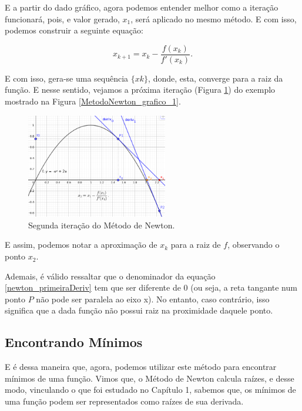 E a partir do dado gráfico, agora podemos entender melhor como a iteração
funcionará, pois, e valor gerado, $x_1$, será aplicado no mesmo método. E com
isso, podemos construir a seguinte equação:

\begin{equation}
    x_{k+1} = x_{k} - \frac {f(x_{k})}{f'(x_{k})}.
    \label{newton_primeiraDeriv}
\end{equation}

E com isso, gera-se uma sequência $\{xk\}$, donde, esta, converge para a raiz
da função. E nesse sentido, vejamos a próxima iteração (Figura
\ref{MetodoNewton_grafico_2}) do exemplo mostrado na Figura
\ref{MetodoNewton_grafico_1}.

\begin{figure}[ht]
    \includegraphics[width=0.55\textwidth]
      {src/MetodoNewton_grafico_2.png}
    \centering
    \caption{
      \centering
      Segunda iteração do Método de Newton.
    }
    \label{MetodoNewton_grafico_2}
\end{figure}

E assim, podemos notar a aproximação de $x_k$ para a raiz de $f$, observando o
ponto $x_2$.

Ademais, é válido ressaltar que o denominador da equação
\ref{newton_primeiraDeriv} tem que ser diferente de 0 (ou seja, a reta tangante
num ponto $P$ não pode ser paralela ao eixo x). No entanto, caso contrário,
isso significa que a dada função não possui raiz na proximidade daquele ponto.

\subsection{Encontrando Mínimos}

E é dessa maneira que, agora, podemos utilizar este método para encontrar
mínimos de uma função. Vimos que, o Método de Newton calcula raízes, e
desse modo, vinculando o que foi estudado no Capítulo 1, sabemos que, os
mínimos de uma função podem ser representados como raízes de sua derivada.

